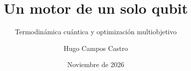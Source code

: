 \documentclass[10pt,aspectratio=169]{beamer}
\title[Un motor de un solo qubit]{Un motor de un solo qubit}
\subtitle{Termodinámica cuántica y optimización multiobjetivo}
\author{Hugo Campos Castro}
\institute[USM]{Universidad Técnica Federico Santa María\\[2pt]\small Termodinámica y Mecánica Estadística}
\date{Noviembre de 2026}
\begin{document}
\frame{\titlepage}








\end{document}
